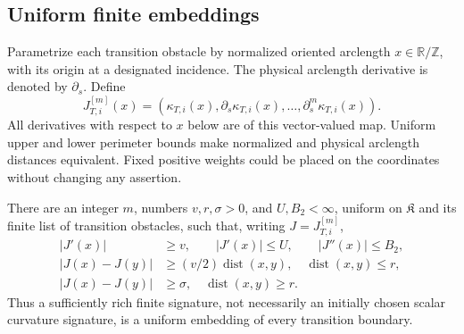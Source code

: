 \subsection{Uniform finite embeddings}

Parametrize each transition obstacle by normalized oriented arclength
\(x\in\mathbb R/\mathbb Z\), with its origin at a designated incidence.
The physical arclength derivative is denoted by \(\partial_s\).  Define
\[
 J_{T,i}^{[m]}(x)=
 (\kappa_{T,i}(x),\partial_s\kappa_{T,i}(x),\ldots,
                                      \partial_s^m\kappa_{T,i}(x)).
\]
All derivatives with respect to \(x\) below are of this vector-valued map.
Uniform upper and lower perimeter bounds make normalized and physical
arclength distances equivalent.  Fixed positive weights could be placed on
the coordinates without changing any assertion.

\begin{theorem}
\label{thm:v25-finite-signature-embedding}
There are an integer \(m\), numbers \(v,r,\sigma>0\), and \(U,B_2<\infty\),
uniform on \(\mathfrak K\) and its finite list of transition obstacles,
such that, writing \(J=J_{T,i}^{[m]}\),
\begin{align}
 |J'(x)|&\ge v,\qquad |J'(x)|\le U,\qquad |J''(x)|\le B_2,
                                            \label{eq:v25-signature-immersion}\\
 |J(x)-J(y)|&\ge(v/2)\operatorname{dist}(x,y),
 \quad \operatorname{dist}(x,y)\le r,
                                            \label{eq:v25-inarc-embedding}\\
 |J(x)-J(y)|&\ge\sigma,
 \quad \operatorname{dist}(x,y)\ge r.
                                            \label{eq:v25-outarc-separation}
\end{align}
Thus a sufficiently rich finite signature, not necessarily an initially
chosen scalar curvature signature, is a uniform embedding of every
transition boundary.
\end{theorem}

